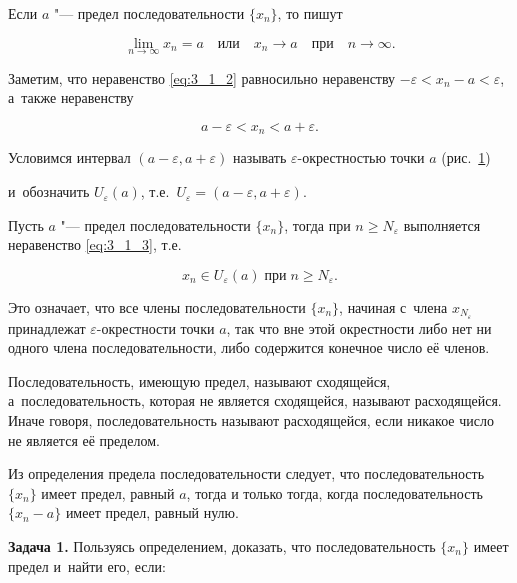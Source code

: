 \noindent
Если $a$ "--- предел последовательности $\{ x_{n} \}$, то пишут

\begin{equation*}
\lim_{n \to \infty} x_{n} = a \quad \text{или} \quad x_{n} \to a \quad \text{при} \quad n \to \infty.
\end{equation*}

\noindent
Заметим, что неравенство \eqref{eq:3_1_2} равносильно неравенству
$-\varepsilon < x_{n} - a < \varepsilon$, а~также неравенству

\begin{equation}\label{eq:3_1_3}
a - \varepsilon < x_{n} < a + \varepsilon.
\end{equation}

Условимся интервал $(a - \varepsilon, a + \varepsilon)$ называть $\varepsilon$-окрестностью
точки $a$ (рис.\ \ref{fig:3_1_2})

\begin{figure}\label{fig:3_1_2}
\end{figure}

\noindent
и~обозначить $U_{\varepsilon}(a)$, т.е.\ $U_{\varepsilon} = (a - \varepsilon, a + \varepsilon)$.

Пусть $a$ "--- предел последовательности $\{ x_{n} \}$, тогда при
$n \geqslant N_{\varepsilon}$ выполняется неравенство \eqref{eq:3_1_3}, т.е.\

\begin{equation*}
x_{n} \in U_{\varepsilon}(a) \; \text{при} \; n \geqslant N_{\varepsilon}.
\end{equation*}

Это означает, что все члены последовательности $\{x_{n}\}$, начиная с~члена
$x_{N_{\varepsilon}}$ принадлежат $\varepsilon$-окрестности точки $a$,
так что вне этой окрестности либо нет ни одного члена последовательности,
либо содержится конечное число её членов.

Последовательность, имеющую предел, называют сходящейся, а~последовательность,
которая не является сходящейся, называют расходящейся. Иначе говоря,
последовательность называют расходящейся, если никакое число не является её пределом.

Из определения предела последовательности следует, что последовательность $\{x_{n}\}$
имеет предел, равный $a$, тогда и только тогда, когда последовательность $\{x_{n}-a\}$
имеет предел, равный нулю.

\textbf{Задача 1.}\label{ex:3_1_1}
Пользуясь определением, доказать, что последовательность $\{x_{n}\}$ имеет предел
и~найти его, если:


